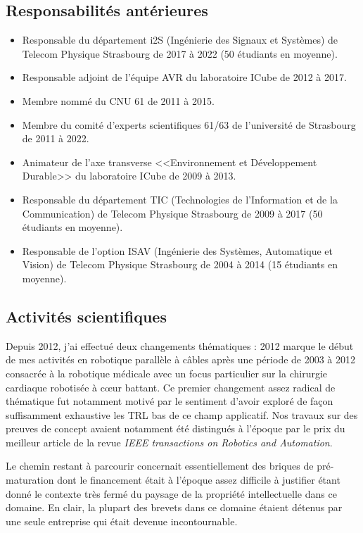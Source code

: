 \documentclass[a4paper,12pt]{article}
\begin{document}
\subsection{Responsabilités antérieures}

\begin{itemize}
    \item Responsable du département i2S (Ingénierie des Signaux et Systèmes) de Telecom Physique Strasbourg de 2017 à 2022 (50 étudiants en moyenne).
    \item Responsable adjoint de l'équipe AVR du laboratoire ICube de 2012 à 2017.
    \item Membre nommé du CNU 61 de 2011 à 2015.
    \item Membre du comité d’experts scientifiques 61/63 de l’université de Strasbourg de 2011 à 2022.
    \item Animateur de l'axe transverse <<Environnement et Développement Durable>> du laboratoire ICube de 2009 à 2013.
    \item Responsable du département TIC (Technologies de l'Information et de la Communication) de Telecom Physique Strasbourg de 2009 à 2017 (50 étudiants en moyenne).
    \item Responsable de l'option ISAV (Ingénierie des Systèmes, Automatique et Vision) de Telecom Physique Strasbourg de 2004 à 2014 (15 étudiants en moyenne).
\end{itemize}

\subsection{Activités scientifiques}

Depuis 2012, j'ai effectué deux changements thématiques : 2012 marque le début de mes activités en robotique parallèle à câbles après une période de 2003 à 2012 consacrée à la robotique médicale avec un focus particulier sur la chirurgie cardiaque robotisée à cœur battant. Ce premier changement assez radical de thématique fut notamment motivé par le sentiment d'avoir exploré de façon suffisamment exhaustive les TRL bas de ce champ applicatif. Nos travaux sur des preuves de concept avaient notamment été distingués à l'époque par le prix du meilleur article de la revue \textit{IEEE transactions on Robotics and Automation}. 

Le chemin restant à parcourir concernait essentiellement des briques de pré-maturation dont le financement était à l'époque assez difficile à justifier étant donné le contexte très fermé du paysage de la propriété intellectuelle dans ce domaine. En clair, la plupart des brevets dans ce domaine étaient détenus par une seule entreprise qui était devenue incontournable.
\end{document}
